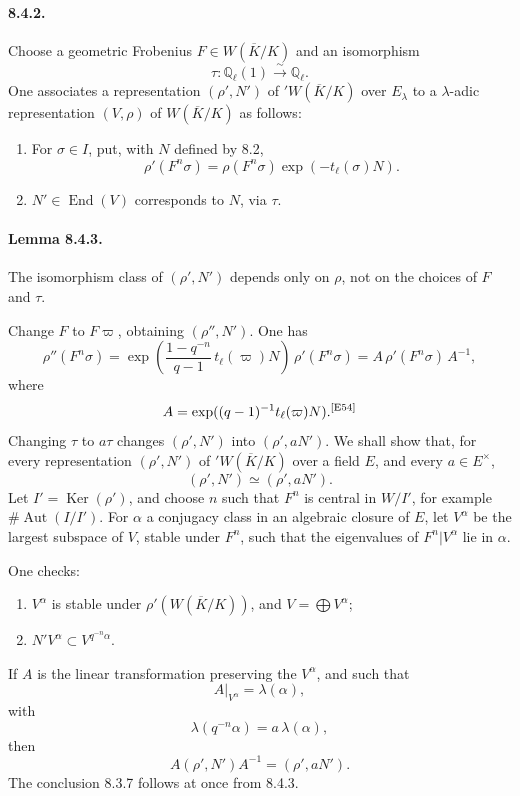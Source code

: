 \documentclass[10pt,letterpaper]{article}
\newcommand{\iso}{\xrightarrow{\sim}}
\providecommand{\Ker}{\operatorname{Ker}}
\providecommand{\Aut}{\operatorname{Aut}}
\providecommand{\End}{\operatorname{End}}
\providecommand{\End}{\operatorname{End}}
\providecommand{\Ker}{\operatorname{Ker}}
\newcommand{\auditmark}[1]{\textsuperscript{\normalfont\scriptsize[E#1]}}
\begin{document}
\paragraph{8.4.2.} Choose a geometric Frobenius \(F\in W(\overline K/K)\) and an isomorphism
\[
\tau:\mathbb Q_\ell(1)\iso\mathbb Q_\ell.
\]
One associates a representation \((\rho',N')\) of \({}'W(\overline K/K)\) over \(E_\lambda\) to a \(\lambda\)-adic representation \((V,\rho)\) of \(W(\overline K/K)\) as follows:
\begin{enumerate}[label=(\alph*)]
\item For \(\sigma\in I\), put, with \(N\) defined by 8.2,
\[
\rho'(F^n\sigma)=\rho(F^n\sigma)\exp(-t_\ell(\sigma)N).
\]
\item \(N'\in\End(V)\) corresponds to \(N\), via \(\tau\).
\end{enumerate}

\paragraph{Lemma 8.4.3.} The isomorphism class of \((\rho',N')\) depends only on \(\rho\), not on the choices of \(F\) and \(\tau\).

Change \(F\) to \(F\varpi\), obtaining \((\rho'',N')\). One has
\[
\rho''(F^n\sigma)=
\exp\left(\frac{1-q^{-n}}{q-1}\,t_\ell(\varpi)N\right)\,\rho'(F^n\sigma)
=
A\,\rho'(F^n\sigma)\,A^{-1},
\]
where
\[
A=\exp((q-1)^{-1}t_\ell(\varpi)N).\auditmark{54}
\]
Changing \(\tau\) to \(a\tau\) changes \((\rho',N')\) into \((\rho',aN')\). We shall show that, for every representation \((\rho',N')\) of \({}'W(\overline K/K)\) over a field \(E\), and every \(a\in E^\times\),
\[
(\rho',N')\simeq(\rho',aN').
\]
Let \(I'=\Ker(\rho')\), and choose \(n\) such that \(F^n\) is central in \(W/I'\), for example \(\#\Aut(I/I')\). For \(\alpha\) a conjugacy class in an algebraic closure of \(E\), let \(V^\alpha\) be the largest subspace of \(V\), stable under \(F^n\), such that the eigenvalues of \(F^n|V^\alpha\) lie in \(\alpha\).

One checks:
\begin{enumerate}[label=(\alph*)]
\item \(V^\alpha\) is stable under \(\rho'(W(\overline K/K))\), and \(V=\bigoplus V^\alpha\);
\item \(N' V^\alpha\subset V^{q^{-n}\alpha}\).
\end{enumerate}
If \(A\) is the linear transformation preserving the \(V^\alpha\), and such that
\[
A|_{V^\alpha}=\lambda(\alpha),
\]
with
\[
\lambda(q^{-n}\alpha)=a\,\lambda(\alpha),
\]
then
\[
A(\rho',N')A^{-1}=(\rho',aN').
\]
The conclusion 8.3.7 follows at once from 8.4.3.
\end{document}
